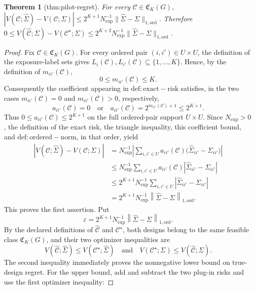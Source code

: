 \documentclass{article}
\newtheorem{theorem}{Theorem}
\begin{document}
\begin{theorem}[thm:pilot-regret]\label{thm:pilot-regret}
For every \(\mathcal C\in\mathfrak C_K(G)\), \(|V(\mathcal C;\widehat\Sigma)-V(\mathcal C;\Sigma)|\le 2^{K+1}N_{\exp}^{-1}\|\widehat\Sigma-\Sigma\|_{1,\mathrm{ord}}\). Therefore \(0\le V(\widehat{\mathcal C};\Sigma)-V(\mathcal C^\star;\Sigma)\le 2^{K+2}N_{\exp}^{-1}\|\widehat\Sigma-\Sigma\|_{1,\mathrm{ord}}\).
\end{theorem}
\begin{proof}
Fix \(\mathcal C\in\mathfrak C_K(G)\).  For every ordered pair \((i,i')\in U\times U\), the definition of the exposure-label sets gives \(L_i(\mathcal C),L_{i'}(\mathcal C)\subseteq\{1,\ldots,K\}\).  Hence, by the definition of \(m_{ii'}(\mathcal C)\),
\[
0\le m_{ii'}(\mathcal C)\le K.
\]
Consequently the coefficient appearing in \(\mathrm{def:exact-risk}\) satisfies, in the two cases \(m_{ii'}(\mathcal C)=0\) and \(m_{ii'}(\mathcal C)>0\), respectively,
\[
a_{ii'}(\mathcal C)=0
\quad\text{or}\quad
a_{ii'}(\mathcal C)=2^{m_{ii'}(\mathcal C)+1}\le 2^{K+1}.
\]
Thus \(0\le a_{ii'}(\mathcal C)\le 2^{K+1}\) on the full ordered-pair support \(U\times U\).  Since \(N_{\exp}>0\), the definition of the exact risk, the triangle inequality, this coefficient bound, and \(\mathrm{def:ordered-norm}\), in that order, yield
\[
\begin{aligned}
\left|V(\mathcal C;\widehat\Sigma)-V(\mathcal C;\Sigma)\right|
&=N_{\exp}^{-1}\left|\sum_{i,i'\in U}a_{ii'}(\mathcal C)
       \bigl(\widehat\Sigma_{ii'}-\Sigma_{ii'}\bigr)\right|\\
&\le N_{\exp}^{-1}\sum_{i,i'\in U}a_{ii'}(\mathcal C)
       \left|\widehat\Sigma_{ii'}-\Sigma_{ii'}\right|\\
&\le 2^{K+1}N_{\exp}^{-1}\sum_{i,i'\in U}
       \left|\widehat\Sigma_{ii'}-\Sigma_{ii'}\right|\\
&=2^{K+1}N_{\exp}^{-1}
       \left\|\widehat\Sigma-\Sigma\right\|_{1,\mathrm{ord}}.
\end{aligned}
\]
This proves the first assertion.  Put
\[
\varepsilon=2^{K+1}N_{\exp}^{-1}
       \left\|\widehat\Sigma-\Sigma\right\|_{1,\mathrm{ord}}.
\]
By the declared definitions of \(\widehat{\mathcal C}\) and \(\mathcal C^\star\), both designs belong to the same feasible class \(\mathfrak C_K(G)\), and their two optimizer inequalities are
\[
V(\widehat{\mathcal C};\widehat\Sigma)
 \le V(\mathcal C^\star;\widehat\Sigma)
\quad\text{and}\quad
V(\mathcal C^\star;\Sigma)
 \le V(\widehat{\mathcal C};\Sigma).
\]
The second inequality immediately proves the nonnegative lower bound on true-design regret.  For the upper bound, add and subtract the two plug-in risks and use the first optimizer inequality:

\end{proof}
\end{document}

